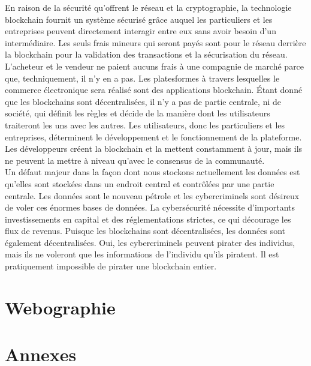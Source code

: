 \documentclass[12pt]{report}
\begin{document}
En raison de la sécurité qu’offrent le réseau et la cryptographie, la technologie blockchain fournit un système sécurisé grâce auquel les particuliers et les entreprises peuvent directement interagir entre eux sans avoir besoin d’un intermédiaire. Les seuls frais mineurs qui seront payés sont pour le réseau derrière la blockchain pour la validation des transactions et la sécurisation du réseau. L’acheteur et le vendeur ne paient aucuns frais à une compagnie de marché parce que, techniquement, il n’y en a pas. Les platesformes à travers lesquelles le commerce électronique sera réalisé sont des applications blockchain. Étant donné que les blockchains sont décentralisées, il n’y a pas de partie centrale, ni de société, qui définit les règles et décide de la manière dont les utilisateurs traiteront les uns avec les autres. Les utilisateurs, donc les particuliers et les entreprises, déterminent le développement et le fonctionnement de la plateforme. Les développeurs créent la blockchain et la mettent constamment à jour, mais ils ne peuvent la mettre à niveau qu’avec le consensus de la communauté.\\

Un défaut majeur dans la façon dont nous stockons actuellement les données est qu’elles sont stockées dans un endroit central et contrôlées par une partie centrale. Les données sont le nouveau pétrole et les cybercriminels sont désireux de voler ces énormes bases de données. La cybersécurité nécessite d’importants investissements en capital et des réglementations strictes, ce qui décourage les flux de revenus. Puisque les blockchains sont décentralisées, les données sont également décentralisées. Oui, les cybercriminels peuvent pirater des individus, mais ils ne voleront que les informations de l’individu qu’ils piratent. Il est pratiquement impossible de pirater une blockchain entier.

\newpage
\section{Webographie}

\newpage
\section{Annexes}
\end{document}
